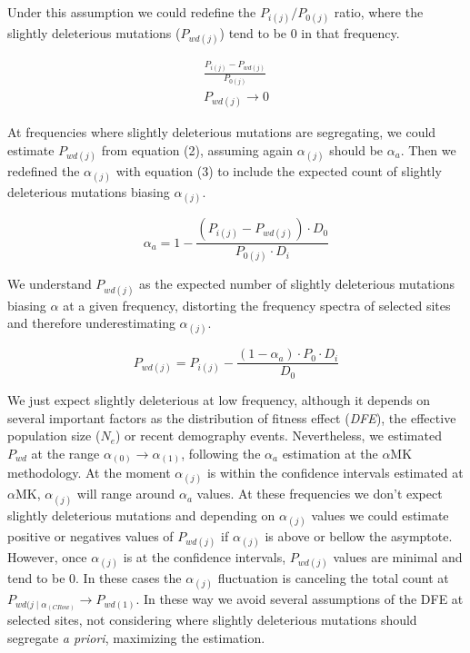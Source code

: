 \documentclass[11pt]{article}
\begin{document}
Under this assumption we could redefine the $P_{i(j)}/P_{0(j)}$ ratio, where the slightly deleterious mutations ($P_{wd(j)}$) tend to be 0 in that frequency.

\begin{equation}
\begin{split}
	\frac{P_{i(j)}-P_{wd(j)}}{P_{0(j)}} \\ 	P_{wd(j)} \to 0
\end{split}
\end{equation}

At frequencies where slightly deleterious mutations are segregating, we could estimate $P_{wd(j)}$ from equation (2), assuming again $\alpha_{(j)}$ should be $\alpha_{a}$. Then we redefined the $\alpha_{(j)}$ with equation (3) to include the expected count of slightly deleterious mutations biasing $\alpha_{(j)}$.

\begin{equation}
	 \alpha_{a} = 1 - \frac{(P_{i(j)}-P_{wd(j)}) \cdot D_{0}}{P_{0(j)} \cdot D_{i}}
\end{equation}

We understand $P_{wd(j)}$ as the expected number of slightly deleterious mutations biasing $\alpha$ at a given frequency, distorting the frequency spectra of selected sites and therefore underestimating $\alpha_{(j)}$.

\begin{equation}
	 P_{wd(j)} = P_{i(j)} - \frac{(1-\alpha_{a}) \cdot P_{0} \cdot D_{i}}{D_{0}}
\end{equation}

We just expect slightly deleterious at low frequency, although it depends on several important factors as the distribution of fitness effect (\emph{DFE}), the effective population size ($N_{e}$) or recent demography events. Nevertheless, we estimated $P_{wd}$ at the range $\alpha_{(0)} \to \alpha_{(1)}$, following the $\alpha_{a}$ estimation at the $\alpha$MK methodology. At the moment $\alpha_{(j)}$ is within the confidence intervals estimated at $\alpha$MK, $\alpha_{(j)}$ will range around $\alpha_{a}$ values. At these frequencies we don't expect slightly deleterious mutations and depending on $\alpha_{(j)}$ values we could estimate positive or negatives values of $P_{wd(j)}$ if $\alpha_{(j)}$ is above or bellow the asymptote. However, once $\alpha_{(j)}$ is at the confidence intervals, $P_{wd(j)}$ values are minimal and tend to be 0. In these cases the $\alpha_{(j)}$ fluctuation is canceling the total count at $P_{wd(j \mid \alpha_{(CI low)}} \to P_{wd(1)}$. In these way we avoid several assumptions of the DFE at selected sites, not considering where slightly deleterious mutations should segregate \emph{a priori}, maximizing the estimation.
\end{document}
